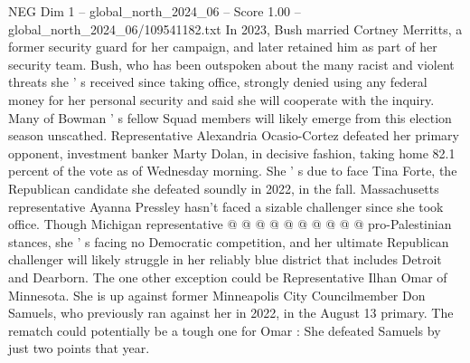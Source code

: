 \begin{textsample}{NEG Dim 1 – global\_north\_2024\_06 – Score 1.00 – global\_north\_2024\_06/109541182.txt}
In 2023, Bush married Cortney Merritts, a former security guard for her campaign, and later retained him as part of her security team.
Bush, who has been outspoken about the many racist and violent threats she ' s received since taking office, strongly denied using any federal money for her personal security and said she will cooperate with the inquiry.
Many of Bowman ' s fellow Squad members will likely emerge from this election season unscathed.
Representative Alexandria Ocasio-Cortez defeated her primary opponent, investment banker Marty Dolan, in decisive fashion, taking home 82.1 percent of the vote as of Wednesday morning.
She ' s due to face Tina Forte, the Republican candidate she defeated soundly in 2022, in the fall.
Massachusetts representative Ayanna Pressley hasn't faced a sizable challenger since she took office.
Though Michigan representative @ @ @ @ @ @ @ @ @ @ pro-Palestinian stances, she ' s facing no Democratic competition, and her ultimate Republican challenger will likely struggle in her reliably blue district that includes Detroit and Dearborn.
The one other exception could be Representative Ilhan Omar of Minnesota.
She is up against former Minneapolis City Councilmember Don Samuels, who previously ran against her in 2022, in the August 13 primary.
The rematch could potentially be a tough one for Omar : She defeated Samuels by just two points that year.

\end{textsample}
